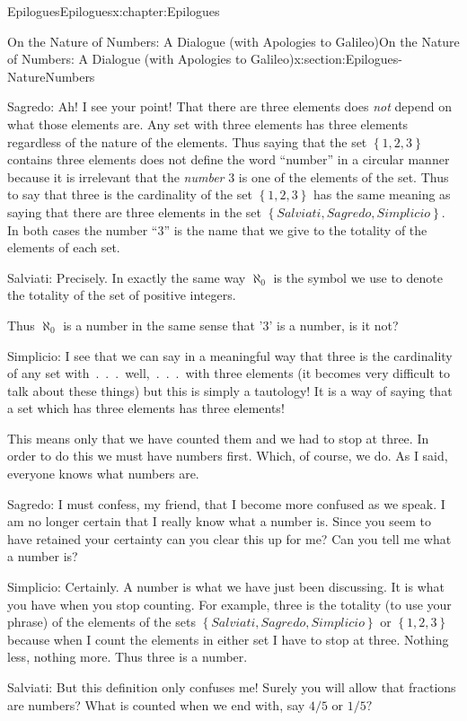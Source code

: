 \begin{chapterptx}{Epilogues}{}{Epilogues}{}{}{x:chapter:Epilogues}
\begin{sectionptx}{On the Nature of Numbers: A Dialogue (with Apologies to Galileo)}{}{On the Nature of Numbers: A Dialogue (with Apologies to Galileo)}{}{}{x:section:Epilogues-NatureNumbers}
\begin{introduction}{}
			\alert{Sagredo}: Ah! I see your point! That there are three elements does \emph{not} depend on what those elements are. Any set with three elements has three elements regardless of the nature of the elements. Thus saying that the set \(\left\{1, 2, 3\right\}\) contains three elements does not define the word ``number'' in a circular manner because it is irrelevant that the \emph{number} 3 is one of the elements of the set. Thus to say that three is the cardinality of the set \(\left\{1, 2, 3\right\}\) has the same meaning as saying that there are three elements in the set \(\left\{Salviati, Sagredo, Simplicio\right\}\). In both cases the number ``\(3\)'' is the name that we give to the totality of the elements of each set.%
			\par
			\alert{Salviati}:  Precisely. In exactly the same way \(\aleph_0\) is the symbol we use to denote the totality of the set of positive integers.%
			\par
			Thus \(\aleph_0\) is a number in the same sense that '\(3\)' is a number, is it not?%
			\par
			\alert{Simplicio}:  I see that we can say in a meaningful way that three is the cardinality of any set with~.~.~.~well,~.~.~.~with three elements (it becomes very difficult to talk about these things) but this is simply a tautology! It is a way of saying that a set which has three elements has three elements!%
			\par
			This means only that we have counted them and we had to stop at three. In order to do this we must have numbers first. Which, of course, we do. As I said, everyone knows what numbers are.%
			\par
			\alert{Sagredo}:  I must confess, my friend, that I become more confused as we speak. I am no longer certain that I really know what a number is. Since you seem to have retained your certainty can you clear this up for me? Can you tell me what a number is?%
			\par
			\alert{Simplicio}:  Certainly. A number is what we have just been discussing. It is what you have when you stop counting. For example, three is the totality (to use your phrase) of the elements of the sets \(\left\{Salviati, Sagredo, Simplicio\right\}\) or \(\left\{1, 2, 3\right\}\) because when I count the elements in either set I have to stop at three. Nothing less, nothing more. Thus three is a number.%
			\par
			\alert{Salviati}:  But this definition only confuses me! Surely you will allow that fractions are numbers? What is counted when we end with, say \(4/5\) or \(1/5?\)%

\end{introduction}
\end{sectionptx}
\end{chapterptx}
